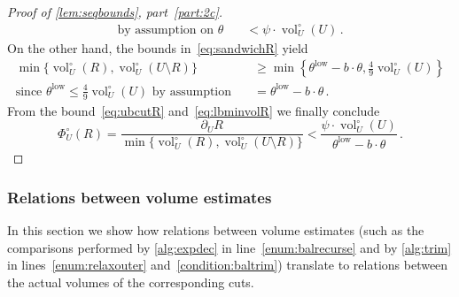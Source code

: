\documentclass[epsfig,letter,11pt]{article}
\numberwithin{equation}{section}
\newcommand{\unvolc}[2]{\operatorname{vol}_{#2}^\circ (#1)}
\newcommand{\unspc}[2]{\Phi_{#2}^\circ (#1)}
\newcommand{\uncut}[2]{{\partial}_{#2} #1}
\DeclareMathOperator*{\low}{low}
\begin{document}
\begin{proof}[Proof of \cref{lem:seqbounds}, part~\eqref{part:2c}]
\begin{align}
		\text{by assumption on $\theta$}\quad & < \psi \cdot {\unvolc{U}{U}} \, . \label{eq:ubcutR}
	\end{align}
On the other hand, the bounds in~\eqref{eq:sandwichR} yield
\begin{align}
	\min\{\unvolc{R}{U},\unvolc{U \setminus R}{U}\} & \ge 	\min\left\{ \theta^{\low}-b \cdot \theta, \frac{4}{9}\unvolc{U}{U}\right\} \\
	\text{since $\theta^{\low} \le \frac{4}{9} \unvolc{U}{U} $ by assumption} \quad & = \theta^{\low}-b \cdot \theta \, .  \label{eq:lbminvolR}
\end{align}
From the bound~\eqref{eq:ubcutR} and~\eqref{eq:lbminvolR} we finally conclude
\begin{equation*}
	\unspc{R}{U} = \frac{	\uncut{R}{U}}{\min\{\unvolc{R}{U},\unvolc{U \setminus R}{U}\}} < \frac{\psi \cdot {\unvolc{U}{U}}}{\theta^{\low}-b \cdot \theta} \, .
\end{equation*}
\end{proof}

\subsubsection{Relations between volume estimates}
\label{subsubsec:estim}
In this section we show how relations between volume estimates (such as the comparisons performed by \cref{alg:expdec} in line~\eqref{enum:balrecurse} and by \cref{alg:trim} in lines~\eqref{enum:relaxouter} and~\eqref{condition:baltrim}) translate to relations between the actual volumes of the corresponding cuts.
\end{document}
